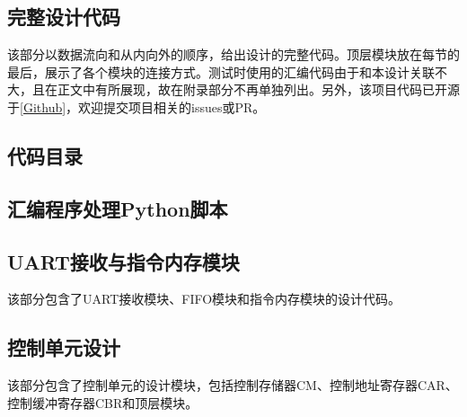 \documentclass[lang=cn,a4paper,newtx]{elegantpaper}
\begin{document}
\begin{appendices}
  \section{完整设计代码}
  该部分以数据流向和从内向外的顺序，给出设计的完整代码。顶层模块放在每节的最后，展示了各个模块的连接方式。测试时使用的汇编代码由于和本设计关联不大，且在正文中有所展现，故在附录部分不再单独列出。另外，该项目代码已开源于[\href{https://github.com/LiPtP0000/CPU_Design}{Github}]，欢迎提交项目相关的issues或PR。
  \subsection{代码目录}
  \lstset{nolol=false}
  \lstlistoflistings
  \newpage
  \subsection{汇编程序处理Python脚本}\label{sec:appendices:python}
  
  \subsection{UART接收与指令内存模块}\label{sec:appendices:uart}
  该部分包含了UART接收模块、FIFO模块和指令内存模块的设计代码。
  
  
  
  
  
  
  
  \subsection{控制单元设计}\label{sec:appendices:control}
  该部分包含了控制单元的设计模块，包括控制存储器CM、控制地址寄存器CAR、控制缓冲寄存器CBR和顶层模块。
  
  
  
  

\end{appendices}
\end{document}
